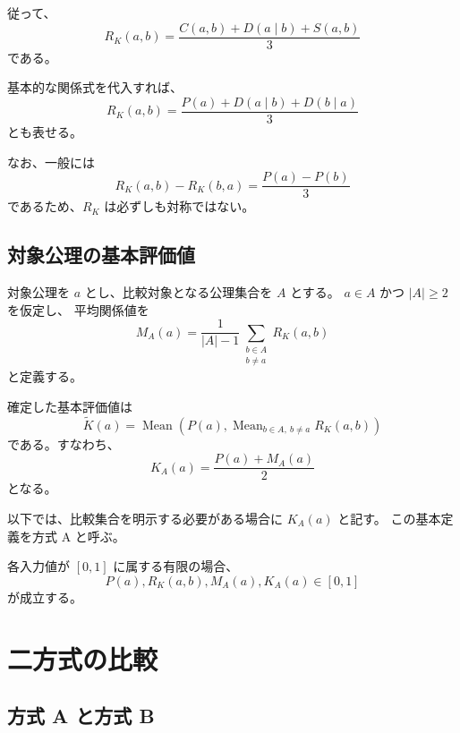 \documentclass[a4paper,11pt]{ltjsarticle}
\begin{document}
従って、
\begin{equation}
  R_K(a,b)
  =
  \frac{
    C(a,b)+D(a\mid b)+S(a,b)
  }{3}
\end{equation}
である。

基本的な関係式を代入すれば、
\begin{equation}
  R_K(a,b)
  =
  \frac{
    P(a)+D(a\mid b)+D(b\mid a)
  }{3}
\end{equation}
とも表せる。

なお、一般には
\begin{equation}
  R_K(a,b)-R_K(b,a)
  =
  \frac{P(a)-P(b)}{3}
\end{equation}
であるため、$R_K$ は必ずしも対称ではない。

\subsection{対象公理の基本評価値}

対象公理を $a$ とし、比較対象となる公理集合を $A$ とする。
$a\in A$ かつ $|A|\geq 2$ を仮定し、
平均関係値を
\begin{equation}
  M_A(a)
  =
  \frac{1}{|A|-1}
  \sum_{\substack{b\in A\\b\ne a}}R_K(a,b)
\end{equation}
と定義する。

確定した基本評価値は
\begin{equation}
  \boxed{
  \widetilde{K}(a)
  =
  \operatorname{Mean}
  \left(
    P(a),
    \operatorname{Mean}_{b\in A,\ b\ne a}R_K(a,b)
  \right)
  }
\end{equation}
である。すなわち、
\begin{equation}
  \boxed{
  K_A(a)=\frac{P(a)+M_A(a)}{2}
  }
\end{equation}
となる。

以下では、比較集合を明示する必要がある場合に $K_A(a)$ と記す。
この基本定義を方式 A と呼ぶ。

各入力値が $[0,1]$ に属する有限の場合、
\begin{equation}
  P(a),R_K(a,b),M_A(a),K_A(a)\in[0,1]
\end{equation}
が成立する。

\section{二方式の比較}

\subsection{方式 A と方式 B}
\end{document}
